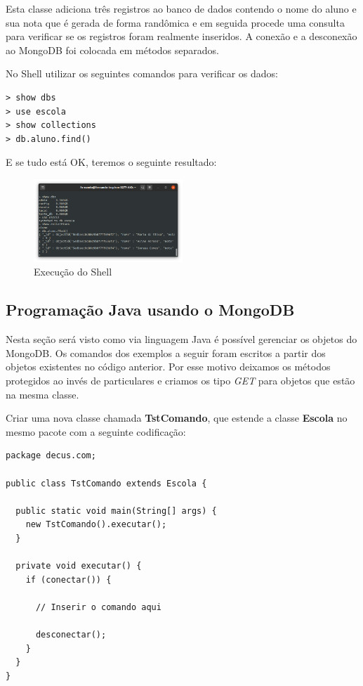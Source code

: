 \documentclass[a4paper,11pt]{article}
\begin{document}
Esta classe adiciona três registros ao banco de dados contendo o nome do aluno e sua nota que é gerada de forma randômica e em seguida procede uma consulta para verificar se os registros foram realmente inseridos. A conexão e a desconexão ao MongoDB foi colocada em métodos separados.

No Shell utilizar os seguintes comandos para verificar os dados:
\begin{lstlisting}
> show dbs
> use escola
> show collections
> db.aluno.find()
\end{lstlisting}

E se tudo está OK, teremos o seguinte resultado:
\begin{figure}[H]
	\centering
	\includegraphics[width=0.5\textwidth]{imagens/testeOK.png}
	\caption{Execução do Shell}
\end{figure}

\subsection{Programação Java usando o MongoDB}
Nesta seção será visto como via linguagem Java é possível gerenciar os objetos do MongoDB. Os comandos dos exemplos a seguir foram escritos a partir dos objetos existentes no código anterior. Por esse motivo deixamos os métodos protegidos ao invés de particulares e criamos os tipo \textit{GET} para objetos que estão na mesma classe.

Criar uma nova classe chamada \textbf{TstComando}, que estende a classe \textbf{Escola} no mesmo pacote com a seguinte codificação:
\begin{lstlisting}
package decus.com;

public class TstComando extends Escola {

  public static void main(String[] args) {
    new TstComando().executar();
  }

  private void executar() {
    if (conectar()) {

      // Inserir o comando aqui

      desconectar();
    }
  }
}
\end{lstlisting}
\end{document}
